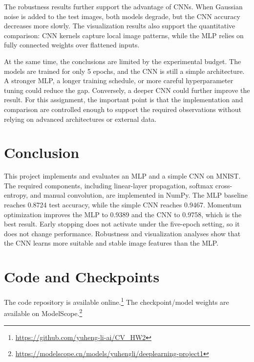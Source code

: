 \documentclass[10pt,twocolumn]{article}
\begin{document}
The robustness results further support the advantage of CNNs. When Gaussian noise is added to the test images, both models degrade, but the CNN accuracy decreases more slowly. The visualization results also support the quantitative comparison: CNN kernels capture local image patterns, while the MLP relies on fully connected weights over flattened inputs.

At the same time, the conclusions are limited by the experimental budget. The models are trained for only 5 epochs, and the CNN is still a simple architecture. A stronger MLP, a longer training schedule, or more careful hyperparameter tuning could reduce the gap. Conversely, a deeper CNN could further improve the result. For this assignment, the important point is that the implementation and comparison are controlled enough to support the required observations without relying on advanced architectures or external data.

\section{Conclusion}
This project implements and evaluates an MLP and a simple CNN on MNIST. The required components, including linear-layer propagation, softmax cross-entropy, and manual convolution, are implemented in NumPy. The MLP baseline reaches 0.8724 test accuracy, while the simple CNN reaches 0.9467. Momentum optimization improves the MLP to 0.9389 and the CNN to 0.9758, which is the best result. Early stopping does not activate under the five-epoch setting, so it does not change performance. Robustness and visualization analyses show that the CNN learns more suitable and stable image features than the MLP.

\section*{Code and Checkpoints}
The code repository is available online.\footnote{\url{https://github.com/yuheng-li-ai/CV_HW2}} The checkpoint/model weights are available on ModelScope.\footnote{\url{https://modelscope.cn/models/yuhengli/deeplearning-project1}}
\end{document}

